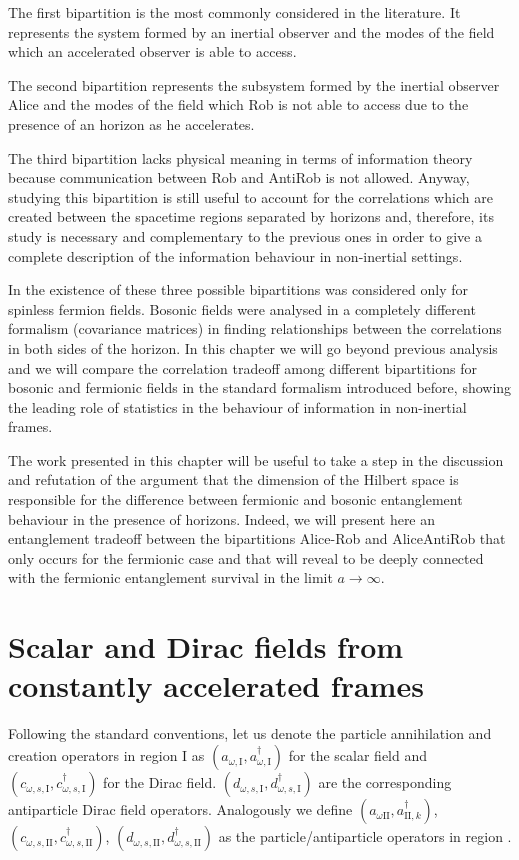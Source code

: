 The first bipartition is the most commonly considered in the literature. It represents the system formed by an inertial observer and the modes of the field which an accelerated observer is able to access.

The second bipartition represents the subsystem formed by the inertial observer Alice and the modes of the field which Rob is not able to access due to the presence of an horizon as he accelerates.

The third bipartition lacks physical meaning in terms of information theory because communication between Rob and AntiRob is not allowed. Anyway, studying this bipartition is still useful to account for the correlations which are created between the spacetime regions separated by horizons and, therefore, its study is necessary and complementary to the previous ones in order to give a complete description of the information behaviour in non-inertial settings.

In \cite{AlsingSchul} the existence of these three possible bipartitions was considered only for spinless fermion fields. Bosonic fields were analysed in a completely different formalism (covariance matrices) in \cite{Adeschul} finding relationships between the correlations in both sides of the horizon. In this chapter we will go beyond previous analysis and we will compare the correlation tradeoff among different bipartitions for bosonic and fermionic fields in the standard formalism introduced before, showing the leading role of statistics in the behaviour of information in non-inertial frames. 

The work presented in this chapter will be useful to take a step in the discussion and refutation of the argument that the dimension of the Hilbert space is responsible for the difference between fermionic and bosonic entanglement behaviour in the presence of horizons. Indeed, we will present here an entanglement tradeoff between the bipartitions Alice-Rob and AliceAntiRob that only occurs for the fermionic case and that will reveal to be deeply connected with the fermionic entanglement survival in the limit $a\rightarrow\infty$.

\section{Scalar and Dirac fields from constantly accelerated frames}\label{sec2}

Following the standard conventions, let us denote the particle annihilation and creation operators in region I as $(a_{\omega,\text{I}}^{\phantom{\dagger}},a^{\dagger}_{\omega,\text{I}})$ for the scalar field  and $(c^{\phantom{\dagger}}_{\omega,s,\text{I}},c^{\dagger}_{\omega,s,\text{I}})$ for the Dirac field. $(d^{\phantom{\dagger}}_{\omega,s,\text{I}},d^{\dagger}_{\omega,s,\text{I}})$ are the corresponding antiparticle Dirac field operators. Analogously we define $(a^{\phantom{\dagger}}_{\omega\text{II}},a^{\dagger}_{\text{II},k})$, $(c^{\phantom{\dagger}}_{\omega,s,\text{II}},c^{\dagger}_{\omega,s,\text{II}})$, $(d^{\phantom{\dagger}}_{\omega,s,\text{II}},d_{\omega,s,\text{II}}^\dagger)$ as the particle/antiparticle operators in region .

